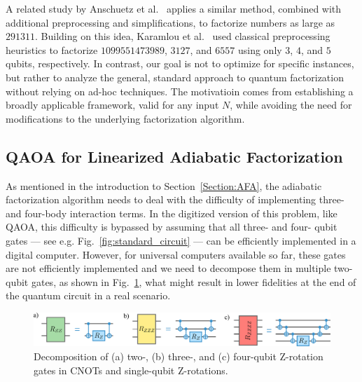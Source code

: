 A related study by Anschuetz et al.~\cite{anschuetz_variational_2018} applies a similar method, combined with additional preprocessing and simplifications, to factorize numbers as large as $291311$. Building on this idea, Karamlou et al.~\cite{karamlou_analyzing_2021} used classical preprocessing heuristics to factorize $1099551473989$, $3127$, and $6557$ using only $3$, $4$, and $5$ qubits, respectively. In contrast, our goal is not to optimize for specific instances, but rather to analyze the general, standard approach to quantum factorization without relying on ad-hoc techniques. The motivatioin comes from establishing a broadly applicable framework, valid for any input $N$, while avoiding the need for modifications to the underlying factorization algorithm.

\subsection{QAOA for Linearized Adiabatic Factorization}
As mentioned in the introduction to Section~\ref{Section:AFA}, the adiabatic factorization algorithm
needs to deal with the difficulty of implementing three- and four-body interaction terms. In the 
digitized version of this problem, like QAOA, this difficulty is bypassed by assuming that all three- and four- qubit gates --- see e.g. Fig.~\ref{fig:standard_circuit} --- can be efficiently implemented in a digital computer. However, for universal computers available so far, these gates are not efficiently implemented and we need to decompose them in multiple two-qubit gates, as shown in Fig.~\ref{fig:gate_decomposition}, what might result in lower fidelities at the end of the quantum circuit in a real scenario.

\begin{figure}[h]
    \centering
    \includegraphics[width=1\textwidth]{02-factorization/figs/gate_decomposition.pdf}
    \caption{Decomposition of (a) two-, (b) three-, and (c) four-qubit Z-rotation gates in CNOTs and
    single-qubit Z-rotations.}
    \label{fig:gate_decomposition}
\end{figure}

